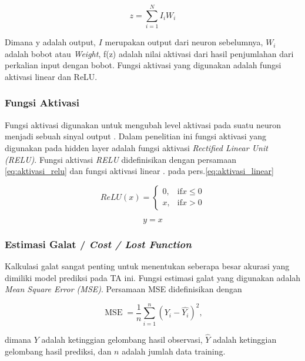 \begin{equation}
\label{eq:mcullochNeuralNetwork}
    z = \sum_{i=1}^N I_iW_i
\end{equation}

Dimana y adalah output, $I$ merupakan output dari neuron sebelumnya, $W_{i}$ adalah bobot atau \emph{Weight}, f(z) adalah nilai aktivasi dari hasil penjumlahan dari perkalian input dengan bobot. Fungsi aktivasi yang digunakan adalah fungsi aktivasi linear dan ReLU. 

\subsubsection{Fungsi Aktivasi}

Fungsi aktivasi digunakan untuk mengubah level aktivasi pada suatu neuron menjadi sebuah sinyal output \cite{KarlicOlgacPerformanceAnalysis}. Dalam penelitian ini fungsi aktivasi yang digunakan pada hidden layer adalah  fungsi aktivasi \emph{Rectified Linear Unit (RELU)}\cite{glorot2011deep}. Fungsi aktivasi \emph{RELU} didefinisikan dengan persamaan \ref{eq:aktivasi_relu}  dan fungsi aktivasi linear \cite{MLBishop}. pada pers.\ref{eq:aktivasi_linear}

\begin{equation} 
    \label{eq:aktivasi_relu}
ReLU (x)=\begin{cases} 0, & \mbox{if} x\le 0 \\ x, & \mbox{if} x > 0 \end{cases}
\end{equation}

\begin{equation}
    \label{eq:aktivasi_linear}
    y=x
\end{equation}


\subsubsection{Estimasi Galat / \emph{Cost / Lost Function}}

Kalkulasi galat sangat penting untuk menentukan seberapa besar akurasi yang dimiliki model prediksi pada TA ini. Fungsi estimasi galat yang digunakan adalah \emph{Mean Square Error (MSE)}. Persamaan MSE didefinisikan dengan

\begin{equation}
    \operatorname{MSE}=\frac{1}{n}\sum_{i=1}^n(Y_i-\hat{Y_i})^2,
\end{equation}

dimana $Y$ adalah ketinggian gelombang hasil observasi, $\hat{Y}$ adalah ketinggian gelombang hasil prediksi, dan $n$ adalah jumlah data training.

